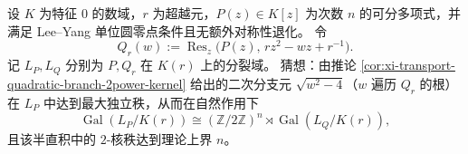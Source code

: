 \begin{conjecture}[输运二次分支的典型满秩独立性]\label{conj:xi-transport-quadratic-branches-typical-full-rank}
设 \(K\) 为特征 \(0\) 的数域，\(r\) 为超越元，\(P(z)\in K[z]\) 为次数 \(n\) 的可分多项式，并满足 Lee--Yang 单位圆零点条件且无额外对称性退化。
令
\[
Q_r(w):=\operatorname{Res}_z\!\bigl(P(z),\,rz^2-wz+r^{-1}\bigr).
\]
记 \(L_P,L_Q\) 分别为 \(P,Q_r\) 在 \(K(r)\) 上的分裂域。
猜想：由推论 \ref{cor:xi-transport-quadratic-branch-2power-kernel} 给出的二次分支元
\(\sqrt{w^2-4}\)（\(w\) 遍历 \(Q_r\) 的根）在 \(L_P\) 中达到最大独立秩，从而在自然作用下
\[
\operatorname{Gal}(L_P/K(r))
\cong
(\mathbb Z/2\mathbb Z)^n\rtimes \operatorname{Gal}(L_Q/K(r)),
\]
且该半直积中的 \(2\)-核秩达到理论上界 \(n\)。
\end{conjecture}

\endinput
